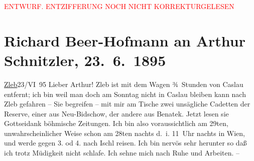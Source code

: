 
\begin{center}
            \textcolor{red}{ENTWURF. ENTZIFFERUNG NOCH NICHT KORREKTURGELESEN}
                      \end{center}
            
               \section[Richard Beer-Hofmann an Arthur Schnitzler, 23. 6. 1895]{ Richard Beer-Hofmann an Arthur Schnitzler, 23. 6. 1895}\nopagebreak{}\rehead{ }\begin{ledgroupsized}[t]{13cm}\normalsize\beginnumbering{} \toendnotes[C]{\smallbreak\pagebreak[2]} 
\pstart
           {\pb}\uline{Zleb}23/VI 95\pend
           \pstart
           Lieber Arthur! Zleb ist mit
                    dem Wagen ¾ Stunden von Caslau entfernt; ich
                    bin weil man doch am Sonntag nicht in Caslau bleiben kann nach Zleb gefahren – Sie begreifen – mit mir am Tische zwei
                    unsägliche Cadetten der Reserve, einer aus Neu-Bidschow, der andere {\pb}aus Benatek. Jetzt lesen sie Gottseidank böhmische Zeitungen.\pend
           \pstart
           Ich bin also voraussichtlich am 29ten, unwahrscheinlicher Weise
                    schon am 28ten{ }nachts d. i. 11 Uhr nachts in Wien, und werde gegen 3. od 4. nach
                        Ischl reisen. Ich bin nervös sehr
                    herunter {\pb}so daß ich trotz
                    Müdigkeit nicht schlafe. Ich sehne mich nach Ruhe und Arbeiten. –\pend
           \pstart

\end{ledgroupsized}

